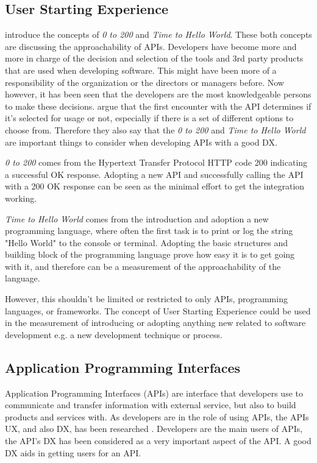 \documentclass[english, 12pt, a4paper, sci, utf8, a-1b, online]{aaltothesis}
\begin{document}
\subsection{User Starting Experience}

\cite{api-designers} introduce the concepts of \textit{0 to 200} and \textit{Time to Hello World}. These both concepts are discussing the approachability of APIs. Developers have become more and more in charge of the decision and selection of the tools and 3rd party products that are used when developing software. This might have been more of a responsibility of the organization or the directors or managers before. Now however, it has been seen that the developers are the most knowledgeable persons to make these decisions. \cite{api-designers} argue that the first encounter with the API determines if it's selected for usage or not, especially if there is a set of different options to choose from. Therefore they also say that the \textit{0 to 200} and \textit{Time to Hello World} are important things to consider when developing APIs with a good DX.

\textit{0 to 200} comes from the Hypertext Transfer Protocol HTTP code 200 indicating a successful OK response. Adopting a new API and successfully calling the API with a 200 OK response can be seen as the minimal effort to get the integration working.

\textit{Time to Hello World} comes from the introduction and adoption a new programming language, where often the first task is to print or log the string "Hello World" to the console or terminal. Adopting the basic structures and building block of the programming language prove how easy it is to get going with it, and therefore can be a measurement of the approachability of the language.

However, this shouldn't be limited or restricted to only APIs, programming languages, or frameworks. The concept of User Starting Experience could be used in the measurement of introducing or adopting anything new related to software development e.g. a new development technique or process.

\subsection{Application Programming Interfaces}

Application Programming Interfaces (APIs) are interface that developers use to communicate and transfer information with external service, but also to build products and services with. As developers are in the role of using APIs, the APIs UX, and also DX, has been researched \citep{api-designers}. Developers are the main users of APIs, the API's DX has been considered as a very important aspect of the API. A good DX aids in getting users for an API.
\end{document}
